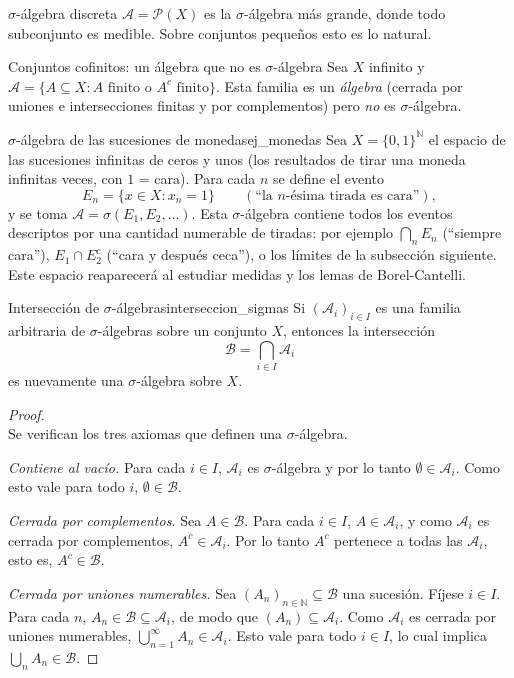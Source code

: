 \documentclass[11pt, a4paper]{article}
\begin{document}
\begin{ejemplo}{$\sigma$-álgebra discreta}{}
$\mathcal{A} = \mathcal{P}(X)$ es la $\sigma$-álgebra más grande, donde todo subconjunto es
medible. Sobre conjuntos pequeños esto es lo natural.
\end{ejemplo}

\begin{ejemplo}{Conjuntos cofinitos: un álgebra que no es $\sigma$-álgebra}{}
Sea $X$ infinito y $\mathcal{A} = \{A \subseteq X : A \text{ finito o } A^c \text{ finito}\}$.
Esta familia es un \emph{álgebra} (cerrada por uniones e intersecciones finitas y por
complementos) pero \emph{no} es $\sigma$-álgebra.
\end{ejemplo}

\begin{ejemplo}{$\sigma$-álgebra de las sucesiones de monedas}{ej_monedas}
Sea $X = \{0, 1\}^{\mathbb{N}}$ el espacio de las sucesiones infinitas de ceros y unos (los
resultados de tirar una moneda infinitas veces, con $1$ = cara). Para cada $n$ se define el evento
$$ E_n = \{ x \in X : x_n = 1 \} \qquad (\text{``la } n\text{-ésima tirada es cara''}), $$
y se toma $\mathcal{A} = \sigma(E_1, E_2, \dots)$. Esta $\sigma$-álgebra contiene todos los
eventos descriptos por una cantidad numerable de tiradas: por ejemplo $\bigcap_n E_n$
(``siempre cara''), $E_1 \cap E_2^c$ (``cara y después ceca''), o los límites de la
subsección siguiente. Este espacio reaparecerá al estudiar medidas y los lemas de
Borel-Cantelli.
\end{ejemplo}

\begin{proposicion}{Intersección de $\sigma$-álgebras}{interseccion_sigmas}
Si $(\mathcal{A}_i)_{i \in I}$ es una familia arbitraria de
$\sigma$-álgebras sobre un conjunto $X$, entonces la intersección
$$ \mathcal{B} = \bigcap_{i \in I} \mathcal{A}_i $$
es nuevamente una $\sigma$-álgebra sobre $X$.
\end{proposicion}

\begin{proof}\leavevmode\\
Se verifican los tres axiomas que definen una $\sigma$-álgebra.

\textit{Contiene al vacío.} Para cada $i \in I$, $\mathcal{A}_i$ es $\sigma$-álgebra y por lo
tanto $\emptyset \in \mathcal{A}_i$. Como esto vale para todo $i$, $\emptyset \in \mathcal{B}$.

\textit{Cerrada por complementos.} Sea $A \in \mathcal{B}$. Para cada $i \in I$, $A \in
\mathcal{A}_i$, y como $\mathcal{A}_i$ es cerrada por complementos, $A^c \in \mathcal{A}_i$. Por lo
tanto $A^c$ pertenece a todas las $\mathcal{A}_i$, esto es, $A^c \in \mathcal{B}$.

\textit{Cerrada por uniones numerables.} Sea $(A_n)_{n \in \mathbb{N}} \subseteq \mathcal{B}$ una
sucesión. Fíjese $i \in I$. Para cada $n$, $A_n \in \mathcal{B} \subseteq \mathcal{A}_i$, de
modo que $(A_n) \subseteq \mathcal{A}_i$. Como $\mathcal{A}_i$ es cerrada por uniones numerables,
$\bigcup_{n=1}^{\infty} A_n \in \mathcal{A}_i$. Esto vale para todo $i \in I$, lo cual implica
$\bigcup_n A_n \in \mathcal{B}$.
\end{proof}
\end{document}
